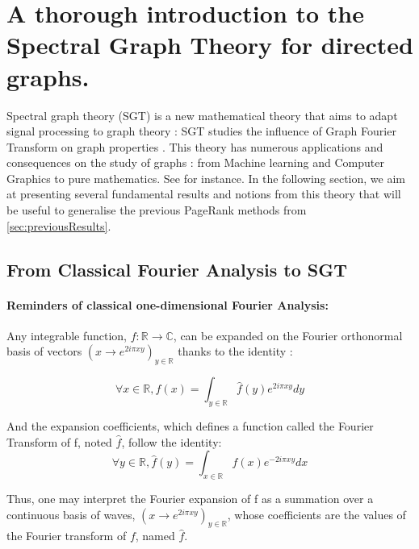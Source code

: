 \documentclass{article}
\begin{document}
\section{A thorough introduction to the Spectral Graph Theory for directed graphs.}
\label{sec:SGTIntro}

Spectral graph theory (SGT) is a new mathematical theory that aims to adapt signal processing to graph theory : SGT studies the influence of Graph Fourier Transform on graph properties \cite{shuman_narang_frossard_ortega_vandergheynst_2013}. This theory has numerous applications and consequences on the study of graphs : from Machine learning and Computer Graphics to pure mathematics. See \cite{chung_1997, ricaud_borgnat_tremblay_gonçalves_vandergheynst_2019, shuman_narang_frossard_ortega_vandergheynst_2013, sevi2019} for instance. In the following section, we aim at presenting several fundamental results and notions from this theory that will be useful to generalise the previous PageRank methods from \ref{sec:previousResults}. 

\subsection{From Classical Fourier Analysis to SGT}

\paragraph{Reminders of classical one-dimensional Fourier Analysis:} \label{par:classical_fourier_analysis}
Any integrable function, $f : \mathbb{R} \rightarrow \mathbb{C}$, can be expanded on the Fourier orthonormal basis of vectors $(x \rightarrow e^{2i\pi x y})_{y \in \mathbb{R}}$ thanks to the identity :

\begin{equation}
    \forall x \in \mathbb{R}, f(x) = \int_{y \in \mathbb{R}} \hat{f}(y) e^{2i\pi x y} dy
\end{equation}

And the expansion coefficients, which defines a function called the Fourier Transform of f, noted $\hat{f}$, follow the identity:
\begin{equation}
    \forall y \in \mathbb{R}, \hat{f}(y) = \int_{x \in \mathbb{R}} f(x) e^{-2i\pi x y} dx
\end{equation}

Thus, one may interpret the Fourier expansion of f as a summation over a continuous basis of waves, $(x \rightarrow e^{2i\pi x y})_{y \in \mathbb{R}}$, whose coefficients are the values of the Fourier transform of $f$, named $\hat{f}$.
\end{document}

